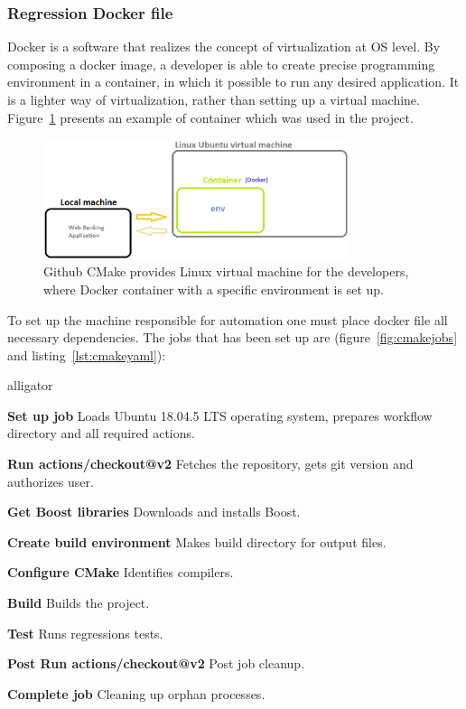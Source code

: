 \documentclass[a4paper,12pt]{book}
\newcommand\tab[1][1cm]{\hspace*{#1}}
\begin{document}
\subsubsection{Regression Docker file}
{
\tab Docker is a software that realizes the concept of virtualization at OS level. By composing a docker image, a developer is able to create precise programming environment in a container, in which it possible to run any desired application. It is a lighter way of virtualization, rather than setting up a virtual machine. Figure~\ref{fig:container} presents an example of container which was used in the project.

\begin{figure}[H]
  \centering
    \includegraphics[width=0.8\textwidth]{scheme}
    \caption{Github CMake provides Linux virtual machine for the developers, where Docker container with a specific environment is set up.}
    \label{fig:container}
\end{figure} 
    
\bigskip 
To set up the machine responsible for automation one must place docker file all necessary dependencies. The jobs that has been set up are (figure~\ref{fig:cmakejobs} and listing~\ref{lst:cmakeyaml}): 
    
\begin{labeling}{alligator}
\item [\textbf{Set up job}] Loads Ubuntu 18.04.5 LTS operating system, prepares workflow directory and all required actions.
\item [\textbf{Run actions/checkout@v2}] Fetches the repository, gets git version and authorizes user.
\item [\textbf{Get Boost libraries}] Downloads and installs Boost.
\item [\textbf{Create build environment}] Makes build directory for output files.
\item [\textbf{Configure CMake}] Identifies compilers.
\item [\textbf{Build}] Builds the project.
\item [\textbf{Test}] Runs regressions tests.
\item [\textbf{Post Run actions/checkout@v2}] Post job cleanup.
\item [\textbf{Complete job}] Cleaning up orphan processes.
\end{labeling} 
    
}
\end{document}
